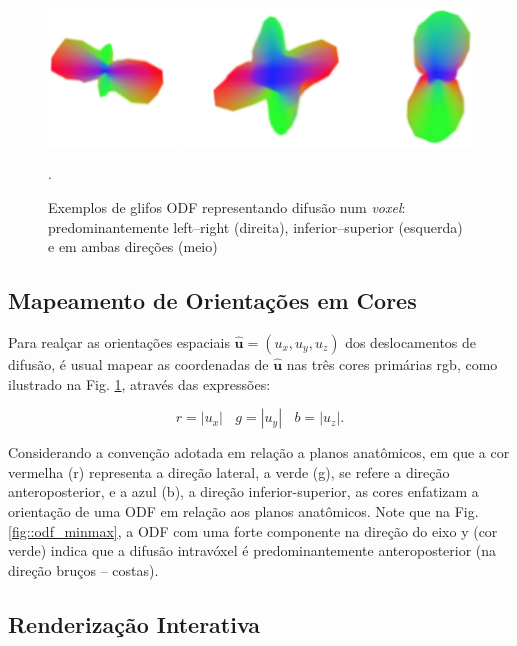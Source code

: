 \documentclass[
    12pt,                %
    oneside,            %
    a4paper,            %
    english,            %
    french,                %
    spanish,            %
    brazil                %
    ]{abntex2}
\begin{document}
\begin{figure}[ht]
    \centering
    \includegraphics[width=.8\linewidth, angle=0]{figs/Esquema_Glifo/Glifos3Ex.png}
    \caption{Exemplos de glifos ODF representando difusão num \textit{voxel}: predominantemente left--right (direita), inferior--superior (esquerda) e em ambas direções (meio)}.
    \label{fig::glifo_ilustrado}
   \hspace{1pt}
\end{figure}

\subsection{Mapeamento de Orientações em Cores}

Para realçar as orientações espaciais $\mathbf{\hat{u}} = (u_x, u_y, u_z)$  dos deslocamentos de difusão, é usual mapear as coordenadas de $\mathbf{\hat{u}}$ nas três cores primárias rgb, como ilustrado na Fig. \ref{fig::glifo_ilustrado}, através das expressões:

\begin{equation}
\label{eq::cor_glifo}
    r = |u_x| ~~~~ g = |u_y| ~~~~ b = |u_z|. 
\end{equation}

Considerando a convenção adotada em relação a planos anatômicos, em que a cor vermelha (r) representa a direção lateral, a verde (g), se refere a direção anteroposterior, e a azul (b), a direção inferior-superior, as
 cores enfatizam a orientação de uma ODF em relação aos planos anatômicos. Note que na Fig. \ref{fig::odf_minmax}, a ODF com uma forte componente na direção do eixo y (cor verde) indica que a difusão intravóxel é predominantemente anteroposterior (na direção bruços -- costas).

\subsection{Renderização Interativa}
\end{document}
